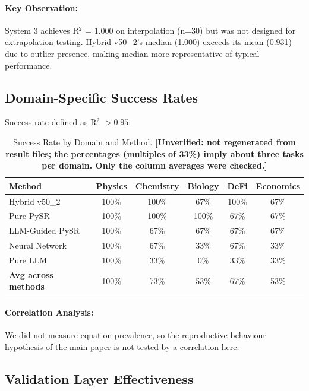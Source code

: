 \documentclass[twoside,11pt]{article}
\begin{document}
\paragraph{Key Observation:} System 3 achieves R$^{2}$ = 1.000 on interpolation (n=30) but was not designed for extrapolation testing. Hybrid v50\_2's median (1.000) exceeds its mean (0.931) due to outlier presence, making median more representative of typical performance.

\subsection{Domain-Specific Success Rates}

Success rate defined as R$^{2}$ $> 0.95$:

\begin{table}[H]
\centering
\caption{Success Rate by Domain and Method.
  \textbf{[Unverified: not regenerated from result files; the percentages (multiples
  of 33\%) imply about three tasks per domain. Only the column averages were
  checked.]}}
\label{tab:domain_success_detailed}
\begin{tabular}{lccccc}
\toprule
\textbf{Method} & \textbf{Physics} & \textbf{Chemistry} & \textbf{Biology} & \textbf{DeFi} & \textbf{Economics} \\
\midrule
Hybrid v50\_2 & 100\% & 100\% & 67\% & 100\% & 67\% \\
Pure PySR & 100\% & 100\% & 100\% & 67\% & 67\% \\
LLM-Guided PySR & 100\% & 67\% & 67\% & 67\% & 67\% \\
Neural Network & 100\% & 67\% & 33\% & 67\% & 33\% \\
Pure LLM & 100\% & 33\% & 0\% & 33\% & 33\% \\
\midrule
\textbf{Avg across methods} & 100\% & 73\% & 53\% & 67\% & 53\% \\
\bottomrule
\end{tabular}
\end{table}

\paragraph{Correlation Analysis:} We did not measure equation prevalence, so the reproductive-behaviour hypothesis of the main paper is not tested by a correlation here.

\clearpage
\subsection{Validation Layer Effectiveness}
\end{document}
